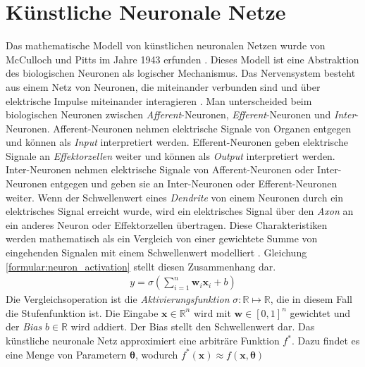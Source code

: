 \chapter{Künstliche Neuronale Netze}
Das mathematische Modell von künstlichen neuronalen Netzen wurde von McCulloch und Pitts im Jahre 1943 erfunden \cite{mcculloch1943logical}.
Dieses Modell ist eine Abstraktion des biologischen Neuronen als logischer Mechanismus.
\newline
\newline
Das Nervensystem besteht aus einem Netz von Neuronen, die miteinander verbunden sind und über elektrische Impulse miteinander interagieren \cite{rosenblatt1961principles}.
Man unterscheided beim biologischen Neuronen zwischen \textit{Afferent}-Neuronen, \textit{Efferent}-Neuronen und \textit{Inter}-Neuronen.
Afferent-Neuronen nehmen elektrische Signale von Organen entgegen und können als \textit{Input} interpretiert werden.
Efferent-Neuronen geben elektrische Signale an \textit{Effektorzellen} weiter und können als \textit{Output} interpretiert werden.
Inter-Neuronen nehmen elektrische Signale von Afferent-Neuronen oder Inter-Neuronen entgegen und geben sie an Inter-Neuronen oder Efferent-Neuronen weiter.
Wenn der Schwellenwert eines \textit{Dendrite} von einem Neuronen durch ein elektrisches Signal erreicht wurde, wird ein elektrisches Signal über den \textit{Axon} an ein
anderes Neuron oder Effektorzellen übertragen.
\newline
\newline
Diese Charakteristiken werden mathematisch als ein Vergleich von einer gewichtete Summe von eingehenden Signalen mit einem Schwellenwert modelliert \cite{higham2019deep}.
Gleichung \ref{formular:neuron_activation} stellt diesen Zusammenhang dar.
\begin{align}
    \label{formular:neuron_activation}
    y = \sigma(\sum_{i=1}^n\textbf{w}_i\textbf{x}_i + b)
\end{align}
Die Vergleichsoperation ist die \textit{Aktivierungsfunktion} $\sigma: \mathbb{R}\mapsto\mathbb{R}$, die in diesem Fall die Stufenfunktion ist.
Die Eingabe $\textbf{x}\in\mathbb{R}^n$ wird mit $\textbf{w}\in[0, 1]^n$ gewichtet und der \textit{Bias} $b\in\mathbb{R}$ wird addiert. Der Bias stellt den Schwellenwert dar.
\newline
\newline
Das künstliche neuronale Netz approximiert eine arbiträre Funktion $f^*$. Dazu findet es eine Menge von Parametern $\boldsymbol\theta$, wodurch $f^*(\textbf{x})\approx f(\textbf{x}, \boldsymbol\theta)$
